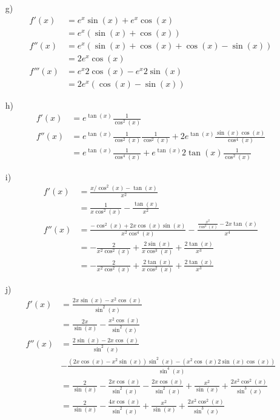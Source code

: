 {\begin{itemize}
\begin{align*}
f'''(x) &= 6 \cos^3(x) -6 \sin(x) 2 \cos(x)\sin(x)-9 \sin^2(x)\cos(x) \\
        &= 6 \cos^3(x) -21 \sin^2(x) \cos(x)             
\end{align*}
\item[g)]
\begin{align*}
f'(x) &= e^x \sin(x) + e^x \cos(x) \\
      &= e^x (\sin(x)+\cos(x)) \\
f''(x) &= e^x ( \sin(x) +\cos(x) +\cos(x) -\sin(x)) \\
       &= 2 e^x \cos(x) \\
f'''(x) &= e^x 2 \cos(x) - e^x 2 \sin(x) \\
        &= 2 e^x (\cos(x)-\sin(x))             
\end{align*}
\item[h)]
\begin{align*}
f'(x) &=   e^{\tan(x)} \frac{1}{\cos^2(x)}\\
f''(x) &=    e^{\tan(x)} \frac{1}{\cos^2(x)} \frac{1}{\cos^2(x)} + 2 e^{\tan(x)}  \frac{\sin(x) \cos(x)}{\cos^4(x)} \\
       &= e^{\tan(x)} \frac{1}{\cos^4(x)} + e^{\tan(x)} 2 \tan(x)  \frac{1}{\cos^2(x)}
\end{align*}
\item[i)]
\begin{align*}
f'(x) &= \frac{x/\cos^2(x) -\tan(x) }{x^2} \\
      &= \frac{1}{x \cos^2(x)} -\frac{\tan(x)}{x^2} \\
f''(x) &= \frac{-\cos^2(x)+2x\cos(x)\sin(x)}{x^2\cos^4(x)}- \frac{\frac{x^2} {\cos^2(x)}-2x\tan(x)}{x^4} \\
       &= - \frac{2}{x^2 \cos^2(x)} +\frac{2 \sin(x)}{x \cos^3(x)} + \frac{2 \tan(x)}{x^3} \\
       &=   - \frac{2}{x^2 \cos^2(x)} +\frac{2 \tan(x)}{x \cos^2(x)} + \frac{2 \tan(x)}{x^3}    
\end{align*}
\item[j)]
\begin{align*}
f'(x) &=   \frac{2x \sin(x)-x^2\cos(x)}{\sin^2(x)}\\
      &= \frac{2x}{\sin(x)} - \frac{x^2 \cos(x)}{\sin^2(x)} \\
f''(x) &= \frac{2\sin(x)-2x\cos(x)}{\sin^2(x)} \\
&- \frac{(2x\cos(x)-x^2\sin(x))\sin^2(x)-(x^2 \cos(x)2\sin(x)\cos(x))}{\sin^4(x)}\\
       &= \frac{2}{\sin(x)} - \frac{2x\cos(x)}{\sin^2(x)} - \frac{2x\cos(x)}{\sin^2(x)}  + \frac{x^2}{\sin(x)} + \frac{2x^2\cos^2(x)}{\sin^3(x)} \\
       &=  \frac{2}{\sin(x)} - \frac{4x\cos(x)}{\sin^2(x)}+ \frac{x^2}{\sin(x)} + \frac{2x^2\cos^2(x)}{\sin^3(x)}
\end{align*}
\end{itemize}



}

